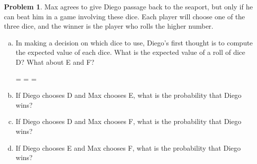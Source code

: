 \documentclass[10pt]{amsart}
\theoremstyle{definition}
\newcommand{\dicegamesanswerbox}[1][\phantom{E}]{\begin{flushright}\framebox[2cm]{\begin{minipage}{.3in}\vspace{.07in}\begin{flushright}\hfill#1\hfill\end{flushright} \vfill \vspace{.13in}\end{minipage}\hfill}\end{flushright}}
\newtheorem{problem}{Problem} %
\begin{document}
\begin{problem}
  Max agrees to give Diego passage back to the seaport, but only if he can beat him in a game involving these dice. Each player will choose one of the three dice, and the winner is the player who rolls the higher number. 
  \begin{enumerate}[(a)]
    \item In making a decision on which dice to use, Diego's first thought is to compute the expected value of each dice. What is the expected value of a roll of dice D? What about E and F?

    \begin{center}
      = \framebox[1.4cm]{\begin{minipage}{1px}\hfill\vspace{.3in}\end{minipage}\hfill}
      \quad
      = \framebox[1.4cm]{\begin{minipage}{1px}\hfill\vspace{.3in}\end{minipage}\hfill}
      \quad
      = \framebox[1.4cm]{\begin{minipage}{1px}\hfill\vspace{.3in}\end{minipage}\hfill}\\
    \end{center}
    \item If Diego chooses D and Max chooses E, what is the probability that Diego wins? 
    \dicegamesanswerbox
    \item If Diego chooses D and Max chooses F, what is the probability that Diego wins?
    \dicegamesanswerbox
    \item If Diego chooses E and Max chooses F, what is the probability that Diego wins?
    \dicegamesanswerbox
  \end{enumerate}
\end{problem}
\end{document}
